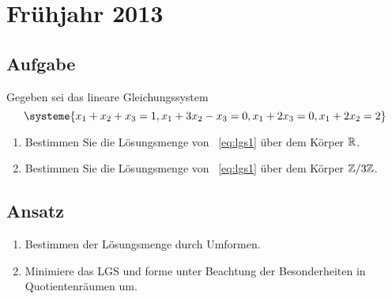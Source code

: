 \newpage

\section{Frühjahr 2013}

\subsection{Aufgabe}
Gegeben sei das lineare Gleichungssystem
\begin{equation}
	\label{lgs1}
	\systeme{x_1 + x_2 + x_3 = 1, x_1 + 3x_2 - x_3 = 0, x_1 + 2x_3 = 0, x_1 + 2x_2 = 2}
\end{equation}
\begin{enumerate}
	\item Bestimmen Sie die Lösungsmenge von ~\ref{eq:lgs1} über dem Körper \( \mathbb{R} \).
	\item Bestimmen Sie die Lösungsmenge von ~\ref{eq:lgs1} über dem Körper \( \mathbb{Z}/3\mathbb{Z} \).
\end{enumerate}

\subsection{Ansatz}
\begin{enumerate}
	\item Bestimmen der Lösungsmenge durch Umformen.
	\item Minimiere das LGS und forme unter Beachtung der Besonderheiten in Quotientenräumen um. 
\end{enumerate}

